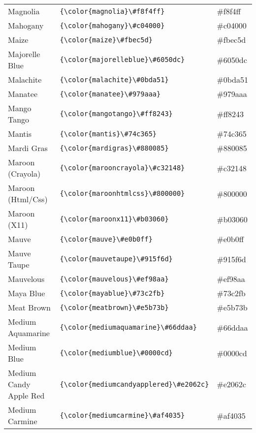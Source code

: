 \documentclass[9.5pt]{article}
\begin{document}
\begin{longtable}{l | l | l}
	Magnolia & \verb!{\color{magnolia}\#f8f4ff}! & {\color{magnolia}\#f8f4ff}\\
	Mahogany & \verb!{\color{mahogany}\#c04000}! & {\color{mahogany}\#c04000}\\
	Maize & \verb!{\color{maize}\#fbec5d}! & {\color{maize}\#fbec5d}\\
	Majorelle Blue & \verb!{\color{majorelleblue}\#6050dc}! & {\color{majorelleblue}\#6050dc}\\
	Malachite & \verb!{\color{malachite}\#0bda51}! & {\color{malachite}\#0bda51}\\
	Manatee & \verb!{\color{manatee}\#979aaa}! & {\color{manatee}\#979aaa}\\
	Mango Tango & \verb!{\color{mangotango}\#ff8243}! & {\color{mangotango}\#ff8243}\\
	Mantis & \verb!{\color{mantis}\#74c365}! & {\color{mantis}\#74c365}\\
	Mardi Gras & \verb!{\color{mardigras}\#880085}! & {\color{mardigras}\#880085}\\
	Maroon (Crayola) & \verb!{\color{marooncrayola}\#c32148}! & {\color{marooncrayola}\#c32148}\\
	Maroon (Html/Css) & \verb!{\color{maroonhtmlcss}\#800000}! & {\color{maroonhtmlcss}\#800000}\\
	Maroon (X11) & \verb!{\color{maroonx11}\#b03060}! & {\color{maroonx11}\#b03060}\\
	Mauve & \verb!{\color{mauve}\#e0b0ff}! & {\color{mauve}\#e0b0ff}\\
	Mauve Taupe & \verb!{\color{mauvetaupe}\#915f6d}! & {\color{mauvetaupe}\#915f6d}\\
	Mauvelous & \verb!{\color{mauvelous}\#ef98aa}! & {\color{mauvelous}\#ef98aa}\\
	Maya Blue & \verb!{\color{mayablue}\#73c2fb}! & {\color{mayablue}\#73c2fb}\\
	Meat Brown & \verb!{\color{meatbrown}\#e5b73b}! & {\color{meatbrown}\#e5b73b}\\
	Medium Aquamarine & \verb!{\color{mediumaquamarine}\#66ddaa}! & {\color{mediumaquamarine}\#66ddaa}\\
	Medium Blue & \verb!{\color{mediumblue}\#0000cd}! & {\color{mediumblue}\#0000cd}\\
	Medium Candy Apple Red & \verb!{\color{mediumcandyapplered}\#e2062c}! & {\color{mediumcandyapplered}\#e2062c}\\
	Medium Carmine & \verb!{\color{mediumcarmine}\#af4035}! & {\color{mediumcarmine}\#af4035}\\

\end{longtable}
\end{document}
